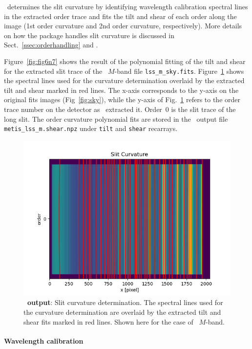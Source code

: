 \pyred~determines the slit curvature by identifying wavelength calibration spectral lines in the extracted order trace and fits the tilt and shear of each order along the image (1st order curvature and 2nd order curvature, respectively). More details on how the package handles slit curvature is discussed in Sect.~\ref{ssec:orderhandling} and \cite{pis21}. 

Figure~\ref{fig:fig6n7} shows the result of the polynomial fitting of the tilt and shear for the extracted slit trace of the \lss~$M$-band file \texttt{lss\_m\_sky.fits}. Figure~\ref{fig:fig8} shows the spectral lines used for the curvature determination  overlaid by the extracted tilt and shear marked in red lines. The x-axis corresponds to the y-axis on the original fits images (Fig~\ref{fig:sky}), while the y-axis of Fig.~\ref{fig:fig8} refers to the order trace number on the detector as \pyred~extracted it. Order~0 is the slit trace of the long slit. The order curvature polynomial fits are stored in the \pyred~output file \texttt{metis\_lss\_m.shear.npz} under \texttt{tilt} and \texttt{shear} recarrays.
\begin{figure}[!ht]
  \centering
  \includegraphics[width=\textwidth]{figures/LSS_CrtAlg_files/Figure_10.png}
  \caption{\textbf{\pyred~output}: Slit curvature determination. The spectral lines used for the curvature determination are overlaid by the extracted tilt and shear fits marked in red lines. Shown here for the case of \lss~$M$-band.}
  \label{fig:fig8}
\end{figure}

\paragraph{Wavelength calibration}\label{sec:critalg_wavecal}

